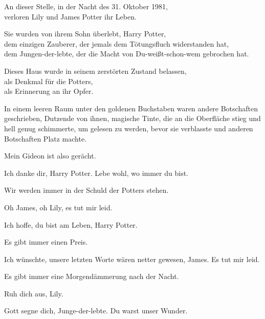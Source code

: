 \begin{center}
An dieser Stelle, in der Nacht des 31. Oktober 1981,\\
verloren Lily und James Potter ihr Leben.

Sie wurden von ihrem Sohn überlebt, Harry Potter,\\
dem einzigen Zauberer, der jemals dem Tötungsfluch widerstanden hat,\\
dem Jungen-der-lebte, der die Macht von Du-weißt-schon-wem gebrochen hat.

Dieses Haus wurde in seinem zerstörten Zustand belassen,\\
als Denkmal für die Potters,\\
als Erinnerung an ihr Opfer.
\end{center}

In einem leeren Raum unter den goldenen Buchstaben waren andere Botschaften geschrieben, Dutzende von ihnen, magische Tinte, die an die Oberfläche stieg und hell genug schimmerte, um gelesen zu werden, bevor sie verblasste und anderen Botschaften Platz machte.

\begin{center}
Mein Gideon ist also gerächt.

Ich danke dir, Harry Potter. Lebe wohl, wo immer du bist.

Wir werden immer in der Schuld der Potters stehen.

Oh James, oh Lily, es tut mir leid.

Ich hoffe, du bist am Leben, Harry Potter.

Es gibt immer einen Preis.

Ich wünschte, unsere letzten Worte wären netter gewesen, James.
Es tut mir leid.

Es gibt immer eine Morgendämmerung nach der Nacht.

Ruh dich aus, Lily.

Gott segne dich, Junge-der-lebte. Du warst unser Wunder.
\end{center}

